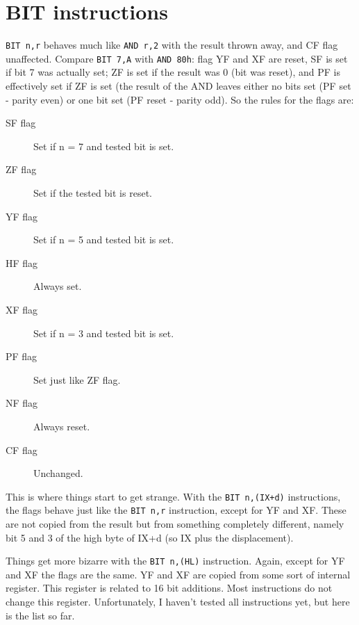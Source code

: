 \documentclass[oneside,a4paper]{book}
\begin{document}
\section{BIT instructions}
\label{bit_flags}

{\tt BIT n,r} behaves much like {\tt AND r,2{\raisebox{1ex}{n}}} with 
the result thrown away, and CF flag unaffected. Compare {\tt BIT 7,A} 
with {\tt AND 80h}: flag YF and XF are reset, SF is set if bit 7 was
actually set; ZF is set if the result was 0 (bit was reset), and PF is
effectively set if ZF is set (the result of the AND leaves either no
bits set (PF set - parity even) or one bit set (PF reset - parity odd). 
So the rules for the flags are:

\begin{description}

\item[SF flag]
  Set if n = 7 and tested bit is set.

\item[ZF flag]
  Set if the tested bit is reset.

\item[YF flag]
  Set if n = 5 and tested bit is set.

\item[HF flag]
  Always set.

\item[XF flag]
  Set if n = 3 and tested bit is set.

\item[PF flag]
  Set just like ZF flag.

\item[NF flag]
  Always reset. 

\item[CF flag]
  Unchanged.

\end{description}

This is where things start to get strange. With the {\tt BIT n,(IX+d)}
instructions, the flags behave just like the 
{\tt BIT n,r} instruction, except for YF and XF. These are not copied 
from the result but from something completely different, namely bit 5 and
3 of the high byte of IX+d (so IX plus the displacement).

Things get more bizarre with the {\tt BIT n,(HL)} instruction. Again,
except for YF and XF the flags are the same. YF and XF are copied from
some sort of internal register. This register is related to 16 bit 
additions. Most instructions do not change this register. Unfortunately, 
I haven't tested all instructions yet, but here is the list so far.
\end{document}
